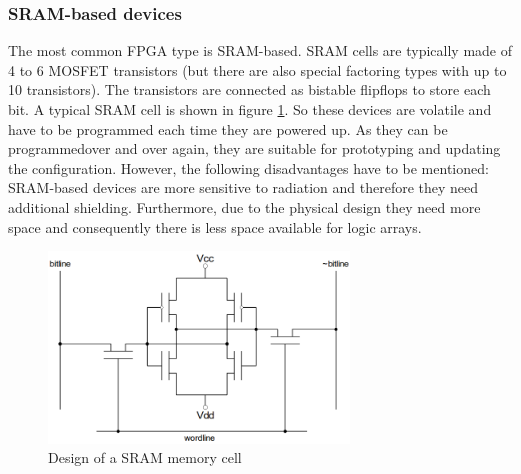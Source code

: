 \subsubsection{SRAM-based devices}
The most common FPGA type is SRAM-based. SRAM cells are typically made of 4 to 6 MOSFET transistors (but there are also special factoring types with up to 10 transistors). The transistors are connected as bistable flipflops to store each bit. A typical SRAM cell is shown in figure \ref{fig:SRAMaufbau}. So these devices are volatile and have to be programmed each time they are powered up. As they can be programmedover and over again, they are suitable for prototyping and updating the configuration. However, the following disadvantages have to be mentioned: SRAM-based devices are more sensitive to radiation and therefore they need additional shielding. Furthermore, due to the physical design they need more space and consequently there is less space available for logic arrays.\cite{Maxfield2009}\\
\begin{figure}[htbp]
\begin{center}
\includegraphics[width=8cm,keepaspectratio=true]{bilder/png/SRAMaufbau}
\caption{Design of a SRAM memory cell\cite{Core16}}
\label{fig:SRAMaufbau}
\end{center}
\end{figure}
